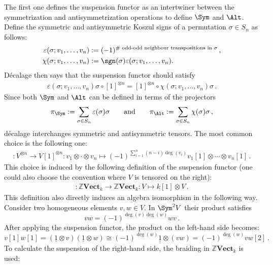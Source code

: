 \begin{remark}
        The first one defines the suspension functor as an intertwiner between the symmetrization and antisymmetrization operations to define $\Sym$ and $\Alt$. Define the symmetric and antisymmetric Koszul signs of a permutation $\sigma\in S_n$ as follows:
        \begin{align}
            \varepsilon(\sigma;v_1,\ldots,v_n) &:= (-1)^{\#\text{ odd-odd neighbour transpositions in }\sigma}\,,\\
            \chi(\sigma;v_1,\ldots,v_n) &:= \sgn(\sigma)\varepsilon(\sigma;v_1,\ldots,v_n).
        \end{align}
        D\'ecalage then says that the suspension functor should satisfy
        \begin{gather}
            \varepsilon(\sigma;v_1,\ldots,v_n)\sigma\circ[1]^{\otimes n} = [1]^{\otimes n}\circ\chi(\sigma;v_1,\ldots,v_n)\sigma\,.
        \end{gather}
        Since both $\Sym$ and $\Alt$ can be defined in terms of the projectors
        \begin{gather}
            \pi_{\Sym}:=\sum_{\sigma\in S_n}\varepsilon(\sigma)\sigma\qquad\text{and} \qquad \pi_{\Alt}:=\sum_{\sigma\in S_n}\chi(\sigma)\sigma\,,
        \end{gather}
        d\'ecalage interchanges symmetric and antisymmetric tensors. The most common choice is the following one:
        \begin{gather}
            [1]:V^{\otimes n}\rightarrow V[1]^{\otimes n}:v_1\otimes\cdot\otimes v_n\mapsto(-1)^{\sum_{i=1}^n(n-i)\deg(v_i)}v_1[1]\otimes\cdots\otimes v_n[1]\,.
        \end{gather}
        This choice is induced by the following definition of the suspension functor (one could also choose the convention where $V$ is tensored on the right):
        \begin{gather}
            [1]:\mathbb{Z}\mathbf{Vect}_k\rightarrow\mathbb{Z}\mathbf{Vect}_k:V\mapsto k[1]\otimes V\,.
        \end{gather}
        This definition also directly induces an algebra isomorphism in the following way. Consider two homogeneous elements $v,w\in V$. In $\Sym^2V$ their product satisfies \[vw = (-1)^{\deg(v)\deg(w)}wv\,.\] After applying the suspension functor, the product on the left-hand side becomes: \[v[1]w[1]=(\underline{1}\otimes v)(\underline{1}\otimes w) \cong (-1)^{\deg(w)}\underline{\underline{1}}\otimes(vw)=(-1)^{\deg(w)}vw[2]\,.\] To calculate the suspension of the right-hand side, the braiding in $\mathbb{Z}\mathbf{Vect}_k$ is used:

\end{remark}
